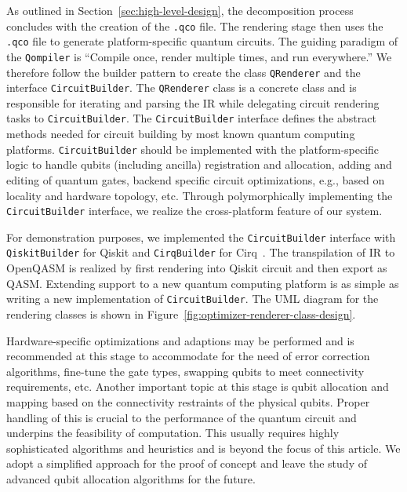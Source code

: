 \documentclass[a4paper,titlepage]{article}
\begin{document}
    As outlined in Section~\ref{sec:high-level-design}, the decomposition process concludes with the creation of the \texttt{.qco} file.
    The rendering stage then uses the \texttt{.qco} file to generate platform-specific quantum circuits.
    The guiding paradigm of the \texttt{Qompiler} is ``Compile once, render multiple times, and run everywhere.''
    We therefore follow the builder pattern to create the class \texttt{QRenderer} and the interface \texttt{CircuitBuilder}.
    The \texttt{QRenderer} class is a concrete class and is responsible for iterating and parsing the IR while delegating
    circuit rendering tasks to \texttt{CircuitBuilder}.
    The \texttt{CircuitBuilder} interface defines the abstract methods needed for circuit building by most known quantum computing platforms.
    \texttt{CircuitBuilder} should be implemented with the platform-specific logic to handle qubits (including ancilla) registration and allocation,
    adding and editing of quantum gates, backend specific circuit optimizations, e.g., based on locality and hardware topology, etc.
    Through polymorphically implementing the \texttt{CircuitBuilder} interface, we realize the cross-platform feature of our system.

    For demonstration purposes, we implemented the \texttt{CircuitBuilder} interface with \texttt{QiskitBuilder} for Qiskit\textregistered\space
    and \texttt{CirqBuilder} for Cirq\texttrademark~\cite{cirq2024,qiskit2023}.
    The transpilation of IR to OpenQASM is realized by first rendering into Qiskit circuit and then export as QASM\@.
    Extending support to a new quantum computing platform is as simple as writing a new implementation of \texttt{CircuitBuilder}.
    The UML diagram for the rendering classes is shown in Figure~\ref{fig:optimizer-renderer-class-design}.


    Hardware-specific optimizations and adaptions may be performed and is recommended at this stage to accommodate for the need of error correction algorithms,
    fine-tune the gate types, swapping qubits to meet connectivity requirements, etc.
    Another important topic at this stage is qubit allocation and mapping based on the connectivity restraints of the physical qubits.
    Proper handling of this is crucial to the performance of the quantum circuit and underpins the feasibility of computation.
    This usually requires highly sophisticated algorithms and heuristics and is beyond the focus of this article.
    We adopt a simplified approach for the proof of concept and leave the study of advanced qubit allocation algorithms for the future.
\end{document}
